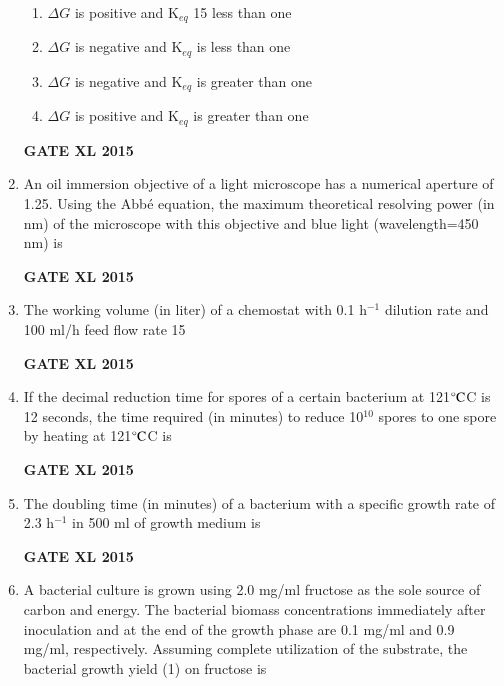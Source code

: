 \documentclass[journal,12pt,onecolumn]{IEEEtran}
\begin{document}
\begin{enumerate}
    \begin{enumerate}
            \item $\Delta G$ is positive and K$_{eq}$ 15 less than one
	    \item $\Delta G$ is negative and K$_{eq}$ is less than one
	    \item $\Delta G$ is negative and K$_{eq}$ is greater than one
            \item $\Delta G$ is positive and K$_{eq}$ is greater than one
    \end{enumerate}
\begin{flushright}\textbf{GATE XL 2015}\end{flushright}
\item An oil immersion objective of a light microscope has a numerical aperture of 1.25. Using the Abbé equation, the maximum theoretical resolving power (in nm) of the microscope with this objective and blue light (wavelength=450 nm) is

\begin{flushright}\textbf{GATE XL 2015}\end{flushright}
\item The working volume (in liter) of a chemostat with 0.1 h$^{-1}$ dilution rate and 100 ml/h feed flow rate 15
\begin{flushright}\textbf{GATE XL 2015}\end{flushright}
\item If the decimal reduction time for spores of a certain bacterium at 121$\celsius$C is 12 seconds, the time required (in minutes) to reduce 10$^{10}$ spores to one spore by heating at 121$\celsius$C is
\begin{flushright}\textbf{GATE XL 2015}\end{flushright}
\item	The doubling time (in minutes) of a bacterium with a specific growth rate of 2.3 h$^{-1}$ in 500 ml of growth medium is
\begin{flushright}\textbf{GATE XL 2015}\end{flushright}
\item
A bacterial culture is grown using 2.0 mg/ml fructose as the sole source of carbon and energy. The bacterial biomass concentrations immediately after inoculation and at the end of the growth phase are 0.1 mg/ml and 0.9 mg/ml, respectively. Assuming complete utilization of the substrate, the bacterial growth yield (1) on fructose is 
        

\end{enumerate}
\end{document}
